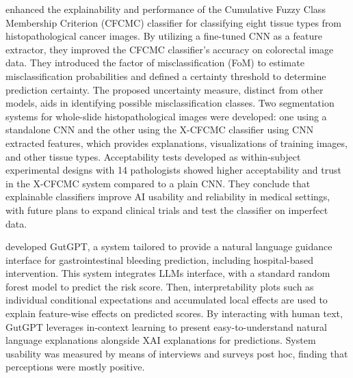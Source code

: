 \cite{sabol2020explainable} enhanced the explainability and performance of the Cumulative Fuzzy Class Membership Criterion (CFCMC) classifier for classifying eight tissue types from histopathological cancer images. By utilizing a fine-tuned CNN as a feature extractor, they improved the CFCMC classifier's accuracy on colorectal image data. They introduced the factor of misclassification (FoM) to estimate misclassification probabilities and defined a certainty threshold to determine prediction certainty. The proposed uncertainty measure, distinct from other models, aids in identifying possible misclassification classes. Two segmentation systems for whole-slide histopathological images were developed: one using a standalone CNN and the other using the X-CFCMC classifier using CNN extracted features, which provides explanations, visualizations of training images, and other tissue types. 
Acceptability tests developed as within-subject experimental designs with 14 pathologists showed higher acceptability and trust in the X-CFCMC system compared to a plain CNN. They conclude that explainable classifiers improve AI usability and reliability in medical settings, with future plans to expand clinical trials and test the classifier on imperfect data.

\cite{rajashekar2024human} developed GutGPT, a system tailored to provide a natural language guidance interface for gastrointestinal bleeding prediction, including hospital-based intervention. This system integrates LLMs interface, with a standard random forest model to predict the risk score. Then, interpretability plots such as individual conditional expectations and accumulated local effects are used to explain feature-wise effects on predicted scores. By interacting with human text, GutGPT leverages in-context learning to present easy-to-understand natural language explanations alongside XAI explanations for predictions. 
System usability was measured by means of interviews and surveys post hoc, finding that perceptions were mostly positive. 


